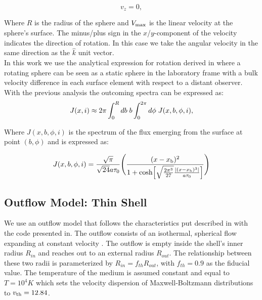 \documentclass{latex/emulateapj}
\begin{document}
\begin{equation}
v_{z}=0, \label{subeq3}
\end{equation}

Where $R$ is the radius of the sphere and $V_{\rm max}$ is the linear velocity at the sphere's surface. The minus/plus sign in the $x$/$y$-component of the velocity indicates the direction of rotation. In this case we take the angular velocity in the same direction as the $\hat{k}$ unit vector.\\

In this work we use the analytical expression for rotation derived in \citep{Garavito14} where a rotating sphere can be seen as a static sphere in the laboratory frame with a bulk velocity difference in each surface element with respect to a distant observer. With the previous analysis the outcoming spectra can be expressed as:\\

\begin{equation}
J(x,i) \approx 2\pi \int_0^Rdb \hs b
\int_0^{2\pi}d\phi \hs J(x,b,\phi,i),
\end{equation}

Where $J(x, b, \phi, i)$ is the spectrum of the flux emerging from the surface at point $(b, \phi)$ and is expressed as: 

\begin{equation}
J(x,b,\phi,i)=\frac{\sqrt{\pi}}{\sqrt{24}a\tau_0}\Bigg{(}\frac{(x-x_{\rm
    b})^2}{1+{\rm cosh}\Big{[}\sqrt{\frac{2\pi^3}{27}}\frac{|(x-x_{\rm
        b})^3|}{a\tau_0}\Big{]}}\Bigg{)} 
\end{equation}


\subsection{Outflow Model: Thin Shell}

We use an outflow model that follows the characteristics put described in \citep{Verhamme06} with the code presented in\citep{Orsi12}.  The outflow consists of an isothermal, spherical flow expanding at
constant velocity \vout.  The outflow is empty inside the shell's inner radius $R_{in}$ and reaches out to an external radius $R_{out}$. The relationship between these two radii is parameterized by $R_{in} =
f_{th}R_{out}$, with $f_{th}=0.9$ as the fiducial value. The temperature of the medium is assumed constant and equal to $T=10^4 K$ which sets the velocity dispersion of Maxwell-Boltzmann distributions to $v_{\rm th}=12.84$\kms. \\
\end{document}
